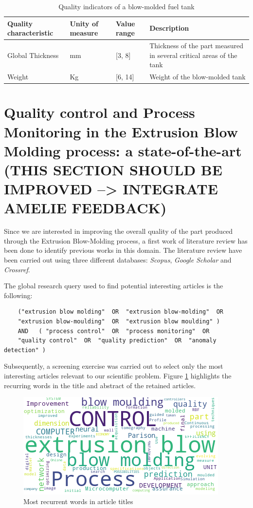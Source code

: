 \begin{table}[]
\caption{Quality indicators of a blow-molded fuel tank }
\label{tab:quality_inidcators}
\begin{tabular}{|l|l|l|p{3cm}|}
\hline
\textbf{Quality characteristic} & \textbf{Unity of measure} & \textbf{Value range} & \textbf{Description}                                                 \\ \hline
Global Thickness           & mm                        & {[}3, 8{]}           & Thickness of the part measured in several critical areas of the tank \\ \hline
Weight & Kg & {[}6, 14{]} & Weight of the blow-molded tank \\ \hline
\end{tabular}
\end{table}




\section{Quality control and Process Monitoring in the Extrusion Blow Molding process: a state-of-the-art (THIS SECTION SHOULD BE IMPROVED --> INTEGRATE AMELIE FEEDBACK)} \label{state-of-the-art}

Since we are interested in improving the overall quality of the part produced through the Extrusion Blow-Molding process, a first work of literature review has been done to identify previous works in this domain. The literature review have been carried out using three different databases: \textit{Scopus}, \textit{Google Scholar} and \textit{Crossref}.

The global research query used to find potential interesting articles is the following:

\begin{verbatim}
    ("extrusion blow molding"  OR  "extrusion blow-molding"  OR
    "extrusion blow-moulding"  OR  "extrusion blow moulding" )  
    AND   ( "process control"  OR  "process monitoring"  OR
    "quality control"  OR  "quality prediction"  OR  "anomaly detection" )
\end{verbatim}

Subsequently, a screening exercise was carried out to select only the most interesting articles relevant to our scientific problem. Figure \ref{fig:wordcloud} highlights the recurring words in the title and abstract of the retained articles. 

\begin{figure}
\centerline{\includegraphics[scale=1]{images/chapter_2/wordcloud.png}}
\caption{Most recurrent words in article titles}
\label{fig:wordcloud}
\end{figure}

